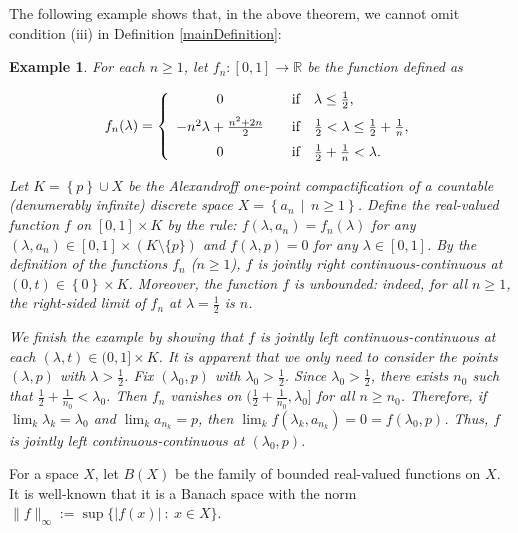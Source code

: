 \documentclass{amsart}
\newtheorem{example}[theorem]{Example}
\begin{document}
The following example shows that, in the above theorem, we cannot omit condition (iii) in Definition \ref{mainDefinition}:

\begin{example} {\rm
For each $n\geq 1$, let $f_n\colon [0,1]\to \mathbb{R}$ be the function defined as


$$
f_n(\lambda)=\left\{\begin{array}{cl}
0 & \quad \text{if} \quad \lambda \leq  \frac{1}{2},\medskip \\
-n^2\lambda+\frac{n^2+2n}{2} & \quad \text{if} \quad \frac{1}{2}< \lambda \leq \frac{1}{2} + \frac{1}{n}, \medskip \\
0 & \quad \text{if} \quad \frac{1}{2} + \frac{1}{n} < \lambda.
 \end{array}\right.
$$


Let $K=\left\{p\right\}\cup X$ be the Alexandroff one-point compactification of a countable (denumerably infinite) discrete space $X=\left\{a_n \, \mid \, n\geq 1\right\}$. Define the real-valued function $f$ on $[0,1]\times K$ by the rule: $f(\lambda,a_n)=f_n (\lambda)$ for any $(\lambda,a_n)\in [0,1]\times \left(K\setminus \{p\}\right)$ and $f(\lambda,p)=0$ for any $\lambda\in [0,1]$. By the definition of the functions $f_n$ ($n\geq 1$), $f$ is jointly right continuous-continuous at  $(0,t)\in \left\{0\right\}\times K$. Moreover, the function $f$ is unbounded: indeed, for all $n\geq 1$, the right-sided limit of $f_n$ at $\lambda=\frac{1}{2}$ is $n$.

We finish the example by showing that $f$ is jointly left continuous-continuous at each $(\lambda,t)\in (0,1]\times K$. It is apparent that we only need to consider the points $(\lambda,p)$ with $\lambda>\frac{1}{2}$. Fix $(\lambda_0,p)$ with $\lambda_0>\frac{1}{2}$. Since $\lambda_0>\frac{1}{2}$, there exists $n_0$ such that $\frac{1}{2}+\frac{1}{n_0}<\lambda_0$. Then $f_n$ vanishes on $(\frac{1}{2}+\frac{1}{n_0},\lambda_0]$ for all $n\geq n_0$.  Therefore, if $\lim_{k}\lambda_k=\lambda_0$ and $\lim_{k}a_{n_k}=p$, then   $\lim_k f(\lambda_k,a_{n_k})=0=f(\lambda_0,p)$. Thus, $f$ is jointly left continuous-continuous at $(\lambda_0,p)$.

}
\end{example}

For a space $X$, let $ B(X)$ be the family of bounded real-valued functions on $X$. It is well-known that it is a Banach space with the norm
$\|f\|_{\infty}:=\sup\{|f(x)|\ : \ x\in X\}$.
\end{document}

